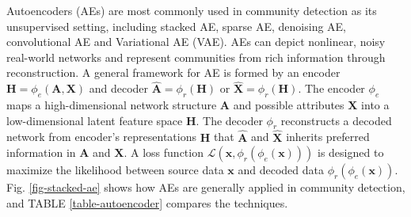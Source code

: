 \label{sec-model-autoencoder}
Autoencoders (AEs) are most commonly used in community detection as its unsupervised setting, including stacked AE, sparse AE, denoising AE, convolutional AE and Variational AE (VAE). AEs can depict nonlinear, noisy real-world networks and represent communities from rich information through reconstruction. A general framework for AE  is formed by an encoder $\bm{H} = \phi_e(\bm{A},\bm{X})$ and decoder $\hat{\bm{A}} = \phi_r(\bm{H})$ or $\bm{\hat{X}} = \phi_r(\bm{H})$. The encoder $\phi_e$ maps a high-dimensional network structure $\bm{A}$ and possible attributes $\bm{X}$ into a low-dimensional latent feature space $\bm{H}$. The decoder $\phi_r$ reconstructs a decoded network from encoder's representations $\bm{H}$ that $\hat{\bm{A}}$ and $\bm{\hat{X}}$ inherits preferred information in $\bm{A}$ and $\bm{X}$. A loss function $\mathcal{L}(\bm{x}, \phi_r(\phi_e(\bm{x})))$ is designed to maximize the likelihood between source data $\bm{x}$ and decoded data $\phi_r(\phi_e(\bm{x}))$. Fig. \ref{fig-stacked-ae} shows how AEs are generally applied in community detection, and TABLE \ref{table-autoencoder} compares the techniques.

